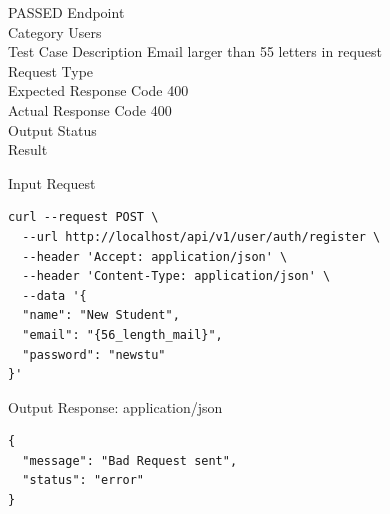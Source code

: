 \begin{testcase}{55}{PASSED}
Endpoint \hfill {}\\
Category \hfill Users\\
Test Case Description \hfill Email larger than 55 letters in request\\

Request Type    \hfill {}\\
Expected Response Code    \hfill 400\\
Actual Response Code    \hfill 400\\

Output Status \hfill {}\\
Result \hfill {}

\begin{ipblock}{Input Request}
\begin{verbatim}
curl --request POST \
  --url http://localhost/api/v1/user/auth/register \
  --header 'Accept: application/json' \
  --header 'Content-Type: application/json' \
  --data '{
  "name": "New Student",
  "email": "{56_length_mail}",
  "password": "newstu"
}'
\end{verbatim}
\end{ipblock}

\begin{opblock}{Output Response: application/json}
\begin{verbatim}
{
  "message": "Bad Request sent",
  "status": "error"
}
\end{verbatim}
\end{opblock}
\end{testcase}

